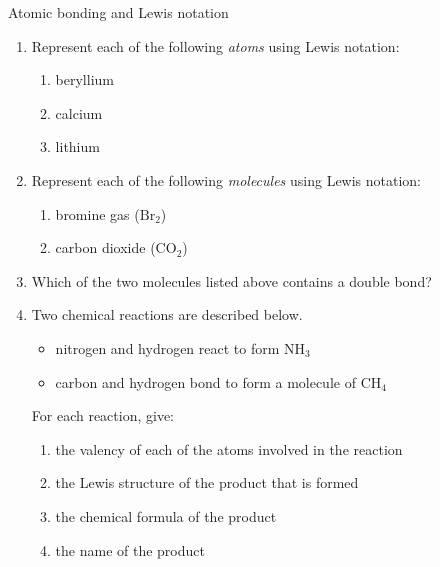            \begin{exercises}{Atomic bonding and Lewis notation}
            \nopagebreak
      \label{m38701*id140889}\begin{enumerate}[noitemsep, label=\textbf{\arabic*}. ] 
            \label{m38701*uid23}\item Represent each of the following \textsl{atoms} using Lewis notation:
\label{m38701*id140910}\begin{enumerate}[noitemsep, label=\textbf{\alph*}. ] 
            \label{m38701*uid24}\item beryllium
\label{m38701*uid25}\item calcium
\label{m38701*uid26}\item lithium
\end{enumerate}
                \label{m38701*uid27}\item Represent each of the following \textsl{molecules} using Lewis notation:
\label{m38701*id140969}\begin{enumerate}[noitemsep, label=\textbf{\alph*}. ] 
            \label{m38701*uid28}\item bromine gas ($\mathrm{Br}{}_{2}$)
\label{m38701*uid29}\item carbon dioxide ($\mathrm{CO}{}_{2}$)
\end{enumerate}
                \label{m38701*uid30}\item Which of the two molecules listed above contains a double bond?\newline
\label{m38701*uid31}\item Two chemical reactions are described below.
\label{m38701*id141048}\begin{itemize}[noitemsep]
            \label{m38701*uid32}\item nitrogen and hydrogen react to form $\mathrm{NH}{}_{3}$\label{m38701*uid33}\item carbon and hydrogen bond to form a molecule of $\mathrm{CH}{}_{4}$\end{itemize}
For each reaction, give:
\label{m38701*id141106}\begin{enumerate}[noitemsep, label=\textbf{\alph*}. ] 
            \label{m38701*uid34}\item the valency of each of the atoms involved in the reaction
\label{m38701*uid35}\item the Lewis structure of the product that is formed
\label{m38701*uid36}\item the chemical formula of the product
\label{m38701*uid37}\item the name of the product

\end{enumerate}
\end{enumerate}
\end{exercises}
